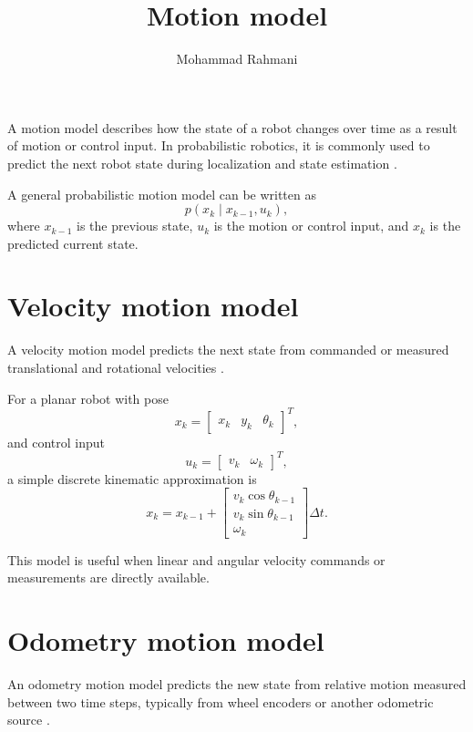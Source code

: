 \documentclass[a4paper]{article}
\title{Motion model}
\date{}
\author{Mohammad Rahmani}
\begin{document}
   \maketitle

   A motion model describes how the state of a robot changes over time as a result of motion or control input. In probabilistic robotics, it is commonly used to predict the next robot state during localization and state estimation \cite{thrun-2005-probabilistic-robotics}.

   A general probabilistic motion model can be written as
   \[
      p(x_k \mid x_{k-1},u_k),
   \]
   where $x_{k-1}$ is the previous state, $u_k$ is the motion or control input, and $x_k$ is the predicted current state.

   \section{Velocity motion model}
      A velocity motion model predicts the next state from commanded or measured translational and rotational velocities \cite{thrun-2005-probabilistic-robotics}.

      For a planar robot with pose
      \[
         x_k =
         \begin{bmatrix}
            x_k & y_k & \theta_k
         \end{bmatrix}^{T},
      \]
      and control input
      \[
         u_k =
         \begin{bmatrix}
            v_k & \omega_k
         \end{bmatrix}^{T},
      \]
      a simple discrete kinematic approximation is
      \[
         x_k =
         x_{k-1}
         +
         \begin{bmatrix}
            v_k\cos\theta_{k-1}\\
            v_k\sin\theta_{k-1}\\
            \omega_k
         \end{bmatrix}
         \Delta t.
      \]

      This model is useful when linear and angular velocity commands or measurements are directly available.

   \section{Odometry motion model}
      An odometry motion model predicts the new state from relative motion measured between two time steps, typically from wheel encoders or another odometric source \cite{thrun-2005-probabilistic-robotics,siegwart-2011-introduction-to-autonomous-mobile-robots}.
\end{document}
